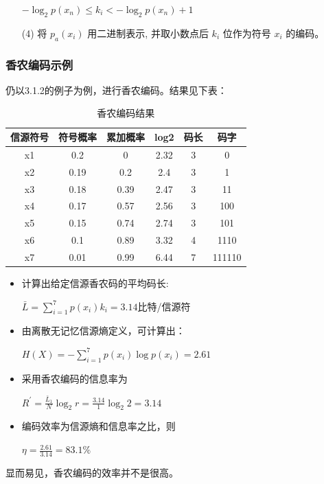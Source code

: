 \begin{multicols}{2}
\begin{enumerate}
	$-\log _{2} p\left(x_{n}\right) \leq k_{i}<-\log _{2} p\left(x_{n}\right)+1 $
	
	\item[(4)] 将  $p_{a}\left(x_{i}\right)$ 用二进制表示, 并取小数点后 $k_{i}$ 位作为符号 $x_{i}$ 的编码。
\end{enumerate}
\subsubsection{香农编码示例}
仍以3.1.2的例子为例，进行香农编码。结果见下表：
\begin{table}[H]
	\footnotesize
	\renewcommand{\arraystretch}{1.0}
	\centering
	\begin{tabular}{cccccc}
			\toprule[1.5pt]
			信源符号 & 符号概率 & 累加概率 & log2 & 码长 & 码字     \\
			\midrule[1pt]
			x1   & 0.2  & 0    & 2.32 & 3  & 0      \\
			x2   & 0.19 & 0.2  & 2.4  & 3  & 1      \\
			x3   & 0.18 & 0.39 & 2.47 & 3  & 11     \\
			x4   & 0.17 & 0.57 & 2.56 & 3  & 100    \\
			x5   & 0.15 & 0.74 & 2.74 & 3  & 101    \\
			x6   & 0.1  & 0.89 & 3.32 & 4  & 1110   \\
			x7   & 0.01 & 0.99 & 6.44 & 7  & 111110 \\
			\bottomrule[1.5pt]
	\end{tabular}
	\caption{\centering 香农编码结果}\label{tb:8}
\end{table}
\begin{itemize}
	\item 计算出给定信源香农码的平均码长:
	
	$\bar{L}=\sum_{i=1}^{7} p\left(x_{i}\right) k_{i}=3.14$比特/信源符
	
	\item 由离散无记忆信源熵定义，可计算出：
	
	$H(X)=-\sum_{i=1}^{7} p\left(x_{i}\right) \log p\left(x_{i}\right)=2.61$
	
	\item 
	采用香农编码的信息率为
	
	$R^{\prime}=\frac{\bar{L}_1}{N} \log _2 r=\frac{3.14}{1} \log _2 2=3.14$
	\item 编码效率为信源熵和信息率之比，则
	
	$\eta=\frac{2.61}{3.14}=83.1\%$
\end{itemize}
显而易见，香农编码的效率并不是很高。


\end{multicols}
